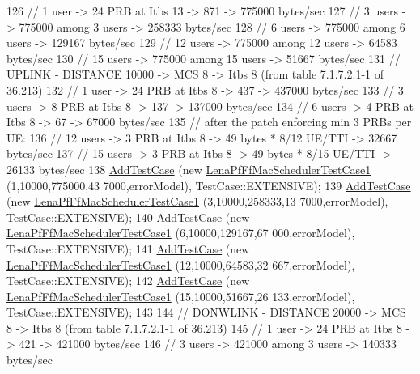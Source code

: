 \begin{DoxyCode}
126   \textcolor{comment}{// 1 user -> 24 PRB at Itbs 13 -> 871 -> 775000 bytes/sec}
127   \textcolor{comment}{// 3 users -> 775000 among 3 users -> 258333 bytes/sec}
128   \textcolor{comment}{// 6 users -> 775000 among 6 users -> 129167 bytes/sec}
129   \textcolor{comment}{// 12 users -> 775000 among 12 users -> 64583 bytes/sec}
130   \textcolor{comment}{// 15 users -> 775000 among 15 users -> 51667 bytes/sec}
131   \textcolor{comment}{// UPLINK - DISTANCE 10000 -> MCS 8 -> Itbs 8 (from table 7.1.7.2.1-1 of 36.213)}
132   \textcolor{comment}{// 1 user -> 24 PRB at Itbs 8 -> 437 -> 437000 bytes/sec}
133   \textcolor{comment}{// 3 users -> 8 PRB at Itbs 8 -> 137 -> 137000 bytes/sec}
134   \textcolor{comment}{// 6 users -> 4 PRB at Itbs 8 -> 67 -> 67000 bytes/sec}
135   \textcolor{comment}{// after the patch enforcing min 3 PRBs per UE:}
136   \textcolor{comment}{// 12 users -> 3 PRB at Itbs 8 -> 49 bytes * 8/12 UE/TTI -> 32667 bytes/sec}
137   \textcolor{comment}{// 15 users -> 3 PRB at Itbs 8 -> 49 bytes * 8/15 UE/TTI -> 26133 bytes/sec}
138   \hyperlink{classns3_1_1TestCase_a3718088e3eefd5d6454569d2e0ddd835}{AddTestCase} (\textcolor{keyword}{new} \hyperlink{classLenaPfFfMacSchedulerTestCase1}{LenaPfFfMacSchedulerTestCase1} (1,10000,775000,43
      7000,errorModel), TestCase::EXTENSIVE);
139   \hyperlink{classns3_1_1TestCase_a3718088e3eefd5d6454569d2e0ddd835}{AddTestCase} (\textcolor{keyword}{new} \hyperlink{classLenaPfFfMacSchedulerTestCase1}{LenaPfFfMacSchedulerTestCase1} (3,10000,258333,13
      7000,errorModel), TestCase::EXTENSIVE);
140   \hyperlink{classns3_1_1TestCase_a3718088e3eefd5d6454569d2e0ddd835}{AddTestCase} (\textcolor{keyword}{new} \hyperlink{classLenaPfFfMacSchedulerTestCase1}{LenaPfFfMacSchedulerTestCase1} (6,10000,129167,67
      000,errorModel), TestCase::EXTENSIVE);
141   \hyperlink{classns3_1_1TestCase_a3718088e3eefd5d6454569d2e0ddd835}{AddTestCase} (\textcolor{keyword}{new} \hyperlink{classLenaPfFfMacSchedulerTestCase1}{LenaPfFfMacSchedulerTestCase1} (12,10000,64583,32
      667,errorModel), TestCase::EXTENSIVE);
142   \hyperlink{classns3_1_1TestCase_a3718088e3eefd5d6454569d2e0ddd835}{AddTestCase} (\textcolor{keyword}{new} \hyperlink{classLenaPfFfMacSchedulerTestCase1}{LenaPfFfMacSchedulerTestCase1} (15,10000,51667,26
      133,errorModel), TestCase::EXTENSIVE);
143  
144   \textcolor{comment}{// DONWLINK - DISTANCE 20000 -> MCS 8 -> Itbs 8 (from table 7.1.7.2.1-1 of 36.213)}
145   \textcolor{comment}{// 1 user -> 24 PRB at Itbs 8 -> 421 -> 421000 bytes/sec}
146   \textcolor{comment}{// 3 users -> 421000 among 3 users -> 140333 bytes/sec}

\end{DoxyCode}
